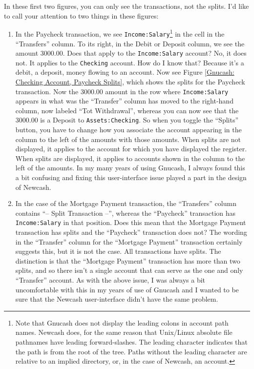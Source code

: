 \documentclass{report}
\begin{document}
In these first two figures, you can only see the transactions, not the splits. I'd like to call your attention to two things in these figures: 
\begin{enumerate}
\item In the Paycheck transaction, we see \verb$Income:Salary$\footnote{Note that Gnucash does not display the leading colons in account path names. Newcash does, for the same reason that Unix/Linux absolute file pathnames have leading forward-slashes. The leading character indicates that the path is from the root of the tree. Paths without the leading character are relative to an implied directory, or, in the case of Newcash, an account.} in the cell in the ``Transfers'' column. To its right, in the Debit or Deposit column, we see the amount 3000.00. Does that apply to  the \verb$Income:Salary$ account? No, it does not. It applies to the \verb|Checking| account. How do I know that? Because it's a debit, a deposit, money flowing to an account. Now see Figure \ref{Gnucash: Checking Account, Paycheck Splits}, which shows the splits for the Paycheck transaction. Now the 3000.00 amount in the row where \verb$Income:Salary$ appears in what was the ``Transfer'' column has moved to the right-hand column, now labeled ``Tot Withdrawal'', whereas you can now see that the 3000.00 is a Deposit to \verb$Assets:Checking$. So when you toggle the ``Splits'' button, you have to change how you associate the account appearing in the column to the left of the amounts with those amounts. When splits are not displayed, it applies to the account for which you have displayed the register. When splits are displayed, it applies to accounts shown in the column to the left of the amounts. In my many years of using Gnucash, I always found this a bit confusing and fixing this user-interface issue played a part in the design of Newcash.
\item In the case of the Mortgage Payment transaction, the ``Transfers'' column contains ``-- Split Transaction --'', whereas the ``Paycheck'' transaction has \verb$Income:Salary$ in that position. Does this mean that the Mortgage Payment transaction has splits and the ``Paycheck'' transaction does not? The wording in the ``Transfer'' column for the ``Mortgage Payment'' transaction certainly suggests this, but it is not the case. All transactions have splits. The distinction is that the ``Mortgage Payment'' transaction has more than two splits, and so there isn't a single account that can serve as the one and only ``Transfer'' account. As with the above issue, I was always a bit uncomfortable with this in my years of use of Gnucash and I wanted to be sure that the Newcash user-interface didn't have the same problem.
\end{enumerate}
\end{document}
